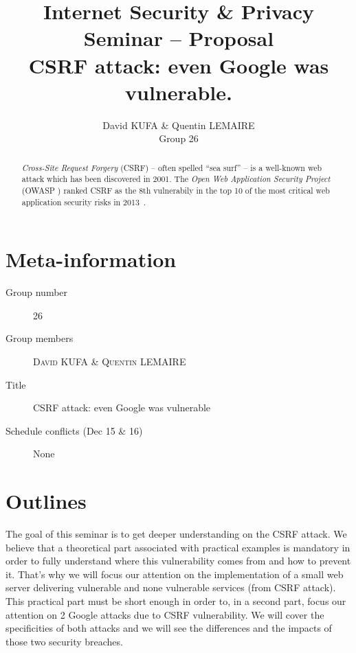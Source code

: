 \documentclass[a4paper,11pt]{article}
\title{Internet Security \& Privacy\\Seminar -- Proposal\\\vspace{10pt}\textbf{CSRF attack: even Google was vulnerable.}}
\author{David KUFA \& Quentin LEMAIRE\\Group 26}
\newcommand{\csrf}{\textit{Cross-Site Request Forgery}}
\begin{document}
  \maketitle %

  \begin{abstract}
  \csrf{} (CSRF) -- often spelled ``sea surf'' -- is a well-known web attack which has 
  been discovered in 2001. The \textit{Open Web Application Security Project} (OWASP \cite{owasp}) 
  ranked CSRF as the 8th vulnerabily in the top 10 of the most critical web application 
  security risks in 2013~\cite{owasp_top_ten}.

  \end{abstract}


  \section{Meta-information}
  
  \begin{description}
   \item[Group number] 26
   \item[Group members] \textsc{David KUFA} \& \textsc{Quentin LEMAIRE}
   \item[Title] CSRF attack: even Google was vulnerable
   \item[Schedule conflicts (Dec 15 \& 16)] None
  \end{description}

  \section{Outlines}
  
  
  
  The goal of this seminar is to get deeper understanding on the CSRF attack. We believe 
  that a theoretical part associated with practical examples is mandatory in order to fully understand 
  where this vulnerability comes from and how to prevent it. That's why we will focus our attention 
  on the implementation of a small web server delivering vulnerable and none vulnerable 
  services (from CSRF attack). This practical part must be short enough in order to, in a second part, focus our 
  attention on 2 Google attacks due to CSRF vulnerability. We will cover the specificities 
  of both attacks and we will see the differences and the impacts of those two security 
  breaches.
  
\end{document}
